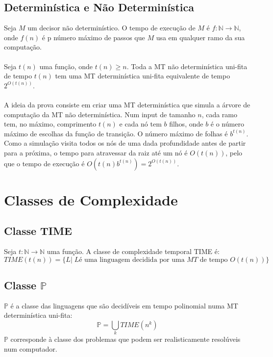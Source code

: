 \documentclass[10pt,a4paper]{report}
\begin{document}
\subsection{Determinística e Não Determinística}
Seja $M$ um decisor não determinístico. O tempo de execução de $M$ é $f:\mathbb{N} \rightarrow \mathbb{N}$, onde $f(n)$ é p número máximo de passos que $M$ usa em qualquer ramo da sua computação.\\
\\
Seja $t(n)$ uma função, onde $t(n) \geq n$. Toda a MT não determinística uni-fita de tempo $t(n)$ tem uma MT determinística uni-fita equivalente de tempo $2^{O(t(n))}$.\\
\\
A ideia da prova consiste em criar uma MT determinística que simula a árvore de computação da MT não determinística. Num input de tamanho $n$, cada ramo tem, no máximo, comprimento $t(n)$ e cada nó tem $b$ filhos, onde $b$ é o número máximo de escolhas da função de transição. O número máximo de folhas é $b^{t(n)}$. Como a simulação visita todos os nós de uma dada profundidade antes de partir para a próxima, o tempo para atravessar da raiz até um nó é $O(t(n))$, pelo que o tempo de execução é $O(t(n)b^{t(n)}) = 2^{O(t(n))}$.
\section{Classes de Complexidade}
\subsection{Classe TIME}
Seja $t: \mathbb{N} \rightarrow \mathbb{N}$ uma função. A classe de complexidade temporal TIME é:
$$
TIME(t(n)) = \{L |\; L \text{é uma linguagem decidida por uma } MT \text{ de tempo } O(t(n))\}
$$
\subsection{Classe $\mathbb{P}$}
$\mathbb{P}$ é a classe das linguagens que são decidíveis em tempo polinomial numa MT determinística uni-fita:
$$
\mathbb{P} = \bigcup_k TIME(n^k)
$$
$\mathbb{P}$ corresponde à classe dos problemas que podem ser realisticamente resolúveis num computador.
\end{document}
